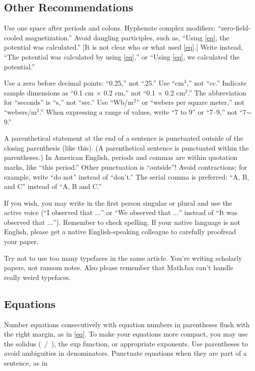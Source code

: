 \documentclass{ieeeaccess}
\begin{document}
\subsection{Other Recommendations}
Use one space after periods and colons. Hyphenate complex modifiers:
``zero-field-cooled magnetization.'' Avoid dangling participles, such as,
``Using \eqref{eq}, the potential was calculated.'' [It is not clear who or what
used \eqref{eq}.] Write instead, ``The potential was calculated by using \eqref{eq},'' or
``Using \eqref{eq}, we calculated the potential.''

Use a zero before decimal points: ``0.25,'' not ``.25.'' Use
``cm$^{3}$,'' not ``cc.'' Indicate sample dimensions as ``0.1 cm
$\times $ 0.2 cm,'' not ``0.1 $\times $ 0.2 cm$^{2}$.'' The
abbreviation for ``seconds'' is ``s,'' not ``sec.'' Use
``Wb/m$^{2}$'' or ``webers per square meter,'' not
``webers/m$^{2}$.'' When expressing a range of values, write ``7 to
9'' or ``7--9,'' not ``7$\sim $9.''

A parenthetical statement at the end of a sentence is punctuated outside of
the closing parenthesis (like this). (A parenthetical sentence is punctuated
within the parentheses.) In American English, periods and commas are within
quotation marks, like ``this period.'' Other punctuation is ``outside''!
Avoid contractions; for example, write ``do not'' instead of ``don't.'' The
serial comma is preferred: ``A, B, and C'' instead of ``A, B and C.''

If you wish, you may write in the first person singular or plural and use
the active voice (``I observed that $\ldots$'' or ``We observed that $\ldots$''
instead of ``It was observed that $\ldots$''). Remember to check spelling. If
your native language is not English, please get a native English-speaking
colleague to carefully proofread your paper.

Try not to use too many typefaces in the same article. You're writing
scholarly papers, not ransom notes. Also please remember that MathJax
can't handle really weird typefaces.

\subsection{Equations}
Number equations consecutively with equation numbers in parentheses flush
with the right margin, as in \eqref{eq}. To make your equations more
compact, you may use the solidus (~/~), the exp function, or appropriate
exponents. Use parentheses to avoid ambiguities in denominators. Punctuate
equations when they are part of a sentence, as in
\end{document}
